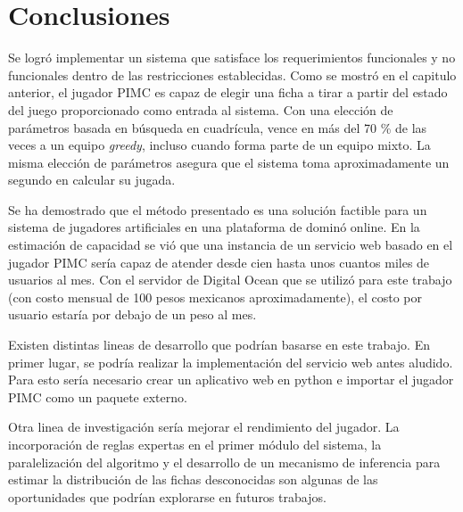 \chapter*{Conclusiones}


\noindent
Se logró implementar un sistema que satisface los requerimientos funcionales y
no funcionales dentro de las restricciones establecidas. Como se mostró en el
capitulo anterior, el jugador PIMC es capaz de elegir una ficha a tirar a partir
del estado del juego proporcionado como entrada al sistema. Con una elección de
parámetros basada en búsqueda en cuadrícula, vence en más del 70 \% de las veces
a un equipo \textit{greedy}, incluso cuando forma parte de un equipo mixto. La
misma elección de parámetros asegura que el sistema toma aproximadamente un
segundo en calcular su jugada.

Se ha demostrado que el método presentado es una solución factible para un
sistema de jugadores artificiales en una plataforma de dominó online. En la
estimación de capacidad se vió que una instancia de un servicio web basado en el
jugador PIMC sería capaz de atender desde cien hasta unos cuantos miles de usuarios
al mes. Con el servidor de Digital Ocean que se utilizó para este trabajo (con
costo mensual de 100 pesos mexicanos aproximadamente), el costo por usuario
estaría por debajo de un peso al mes.

Existen distintas lineas de desarrollo que podrían basarse en este trabajo. En
primer lugar, se podría realizar la implementación del servicio web antes
aludido. Para esto sería necesario crear un aplicativo web en python e importar
el jugador PIMC como un paquete externo.

Otra linea de investigación sería mejorar el rendimiento del jugador. La
incorporación de reglas expertas en el primer módulo del sistema, la
paralelización del algoritmo y el desarrollo de un mecanismo de inferencia para
estimar la distribución de las fichas desconocidas son algunas de las
oportunidades que podrían explorarse en futuros trabajos.